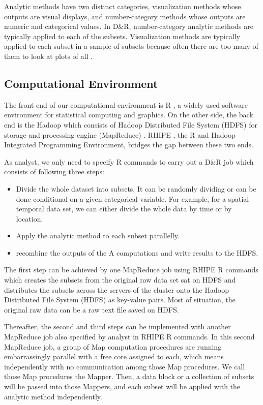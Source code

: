 Analytic methods have two distinct categories, visualization methods whose outputs
are visual displays, and number-category methods whose outputs are numeric and 
categorical values. In D\&R, number-category analytic methods are typically applied
to each of the subsets. Visualization methods are typically applied to each subset 
in a sample of subsets because often there are too many of them to look at plots 
of all \cite{Hafen:2013}.
 
\subsection{Computational Environment}

The front end of our computational environment is R \cite{R}, a widely used 
software environment for statistical computing and graphics. On the other side, the
back end is the Hadoop which consists of Hadoop Distributed File 
System (HDFS) \cite{HDFS} for storage and processing engine (MapReduce) 
\cite{mapreduce}. RHIPE \cite{Guha:2010}, the R and Hadoop Integrated Programming 
Environment, bridges the gap between these two ends. 

As analyst, we only need to specify R commands to carry out a D\&R job which
consists of following three steps:
\begin{itemize}
\item Divide the whole dataset into subsets. It can be randomly dividing or
can be done conditional on a given categorical variable. For example, for a spatial
temporal data set, we can either divide the whole data by time or by location. 
\item Apply the analytic method to each subset parallelly.   
\item recombine the outputs of the A computations and write results to the HDFS. 
\end{itemize}  

The first step can be achieved by one MapReduce job using RHIPE R commands which 
creates the subsets from the original raw data set sat on HDFS and 
distributes the subsets across the servers of the cluster onto the Hadoop 
Distributed File System (HDFS) as key-value pairs. Most of situation, the original
raw data can be a raw text file saved on HDFS.

Thereafter, the second and
third steps can be implemented with another MapReduce job also specified by
analyst in RHIPE R commands. In this second MapReduce job, a group of Map
computation procedures are running embarrassingly parallel with a free core 
assigned to each, which means independently with no communication among those Map
procedures. We call those Map procedures the Mapper. Then, a data block or a 
collection of subsets will be passed into those Mappers, and each subset
will be applied with the analytic method independently.

